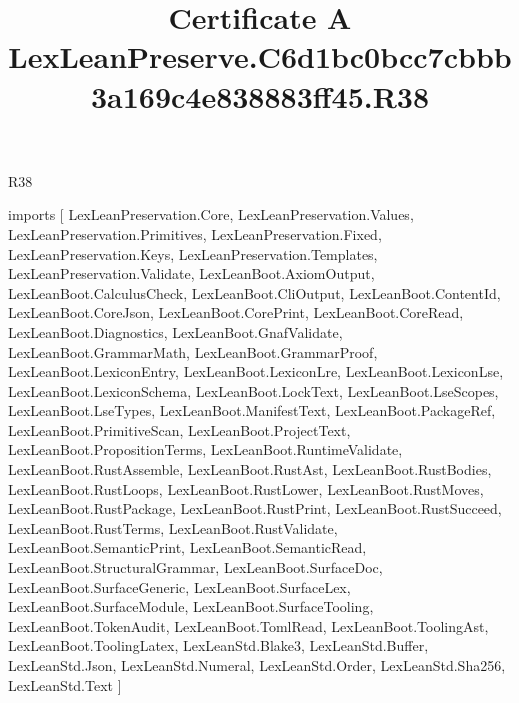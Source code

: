 \begin{lexlean}{R38}
\title{Certificate A LexLeanPreserve.C6d1bc0bcc7cbbb3a169c4e838883ff45.R38}
\begin{coremodule}
imports [
  LexLeanPreservation.Core,
  LexLeanPreservation.Values,
  LexLeanPreservation.Primitives,
  LexLeanPreservation.Fixed,
  LexLeanPreservation.Keys,
  LexLeanPreservation.Templates,
  LexLeanPreservation.Validate,
  LexLeanBoot.AxiomOutput,
  LexLeanBoot.CalculusCheck,
  LexLeanBoot.CliOutput,
  LexLeanBoot.ContentId,
  LexLeanBoot.CoreJson,
  LexLeanBoot.CorePrint,
  LexLeanBoot.CoreRead,
  LexLeanBoot.Diagnostics,
  LexLeanBoot.GnafValidate,
  LexLeanBoot.GrammarMath,
  LexLeanBoot.GrammarProof,
  LexLeanBoot.LexiconEntry,
  LexLeanBoot.LexiconLre,
  LexLeanBoot.LexiconLse,
  LexLeanBoot.LexiconSchema,
  LexLeanBoot.LockText,
  LexLeanBoot.LseScopes,
  LexLeanBoot.LseTypes,
  LexLeanBoot.ManifestText,
  LexLeanBoot.PackageRef,
  LexLeanBoot.PrimitiveScan,
  LexLeanBoot.ProjectText,
  LexLeanBoot.PropositionTerms,
  LexLeanBoot.RuntimeValidate,
  LexLeanBoot.RustAssemble,
  LexLeanBoot.RustAst,
  LexLeanBoot.RustBodies,
  LexLeanBoot.RustLoops,
  LexLeanBoot.RustLower,
  LexLeanBoot.RustMoves,
  LexLeanBoot.RustPackage,
  LexLeanBoot.RustPrint,
  LexLeanBoot.RustSucceed,
  LexLeanBoot.RustTerms,
  LexLeanBoot.RustValidate,
  LexLeanBoot.SemanticPrint,
  LexLeanBoot.SemanticRead,
  LexLeanBoot.StructuralGrammar,
  LexLeanBoot.SurfaceDoc,
  LexLeanBoot.SurfaceGeneric,
  LexLeanBoot.SurfaceLex,
  LexLeanBoot.SurfaceModule,
  LexLeanBoot.SurfaceTooling,
  LexLeanBoot.TokenAudit,
  LexLeanBoot.TomlRead,
  LexLeanBoot.ToolingAst,
  LexLeanBoot.ToolingLatex,
  LexLeanStd.Blake3,
  LexLeanStd.Buffer,
  LexLeanStd.Json,
  LexLeanStd.Numeral,
  LexLeanStd.Order,
  LexLeanStd.Sha256,
  LexLeanStd.Text
]


\end{coremodule}
\end{lexlean}

